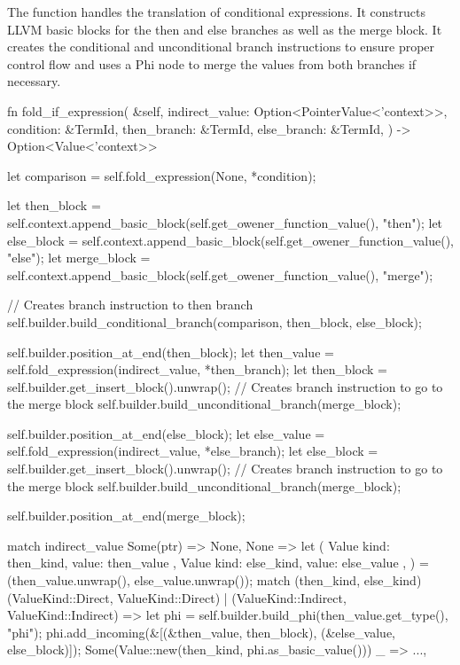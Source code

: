 \documentclass[
  oneside,
  english,
  coorientadorbanca,
  noabntexcite
]{ufsc-thesis-rn46-2019}
\newcommand{\code}[1]{\text{\scpfamily\setlength\spaceskip{0.35em}#1}}
\begin{document}
The \code{fold\_if\_expression} function handles the translation of conditional expressions.
It constructs LLVM basic blocks for the then and else branches as well as the merge block.
It creates the conditional and unconditional branch instructions to ensure proper control flow and uses a Phi node to merge the values from both branches if necessary.

\begin{rustcode}
fn fold_if_expression(
  &self,
  indirect_value: Option<PointerValue<'context>>,
  condition: &TermId,
  then_branch: &TermId,
  else_branch: &TermId,
) -> Option<Value<'context>> {
  let comparison = self.fold_expression(None, *condition);

  let then_block = self.context.append_basic_block(self.get_owener_function_value(), "then");
  let else_block = self.context.append_basic_block(self.get_owener_function_value(), "else");
  let merge_block = self.context.append_basic_block(self.get_owener_function_value(), "merge");

  // Creates branch instruction to then branch
  self.builder.build_conditional_branch(comparison, then_block, else_block);

  self.builder.position_at_end(then_block);
  let then_value = self.fold_expression(indirect_value, *then_branch);
  let then_block = self.builder.get_insert_block().unwrap();
  // Creates branch instruction to go to the merge block
  self.builder.build_unconditional_branch(merge_block);

  self.builder.position_at_end(else_block);
  let else_value = self.fold_expression(indirect_value, *else_branch);
  let else_block = self.builder.get_insert_block().unwrap();
  // Creates branch instruction to go to the merge block
  self.builder.build_unconditional_branch(merge_block);

  self.builder.position_at_end(merge_block); 

  match indirect_value {
    Some(ptr) => None,
    None => {
      let (
        Value { kind: then_kind, value: then_value },
        Value { kind: else_kind, value: else_value },
      ) = (then_value.unwrap(), else_value.unwrap());
      match (then_kind, else_kind) {
        (ValueKind::Direct, ValueKind::Direct) | (ValueKind::Indirect, ValueKind::Indirect) => {
          let phi = self.builder.build_phi(then_value.get_type(), "phi");
          phi.add_incoming(&[(&then_value, then_block), (&else_value, else_block)]);
          Some(Value::new(then_kind, phi.as_basic_value()))
        }
        _ => ...,
      }
    }
  }
}
\end{rustcode}
\end{document}
